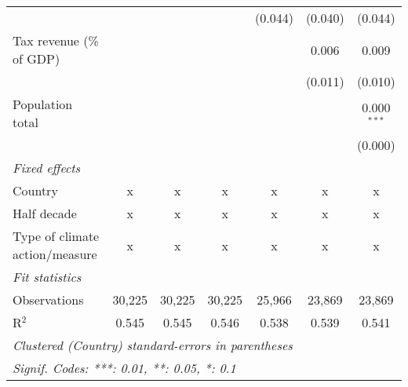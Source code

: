 \begin{tabular}{lcccccc}
                                                                     &         &         &                & (0.044)      & (0.040)       & (0.044)\\   
   Tax revenue (\% of GDP)                                           &         &         &                &              & 0.006         & 0.009\\   
                                                                     &         &         &                &              & (0.011)       & (0.010)\\   
   Population total                                                  &         &         &                &              &               & 0.000$^{***}$\\   
                                                                     &         &         &                &              &               & (0.000)\\   
   \emph{Fixed effects}\\
   Country                                                           & x       & x       & x              & x            & x             & x\\  
   Half decade                                                       & x       & x       & x              & x            & x             & x\\  
   Type of climate action/measure                                    & x       & x       & x              & x            & x             & x\\  
   \midrule \emph{Fit statistics}\\
   Observations                                                      & 30,225  & 30,225  & 30,225         & 25,966       & 23,869        & 23,869\\  
   R$^2$                                                             & 0.545   & 0.545   & 0.546          & 0.538        & 0.539         & 0.541\\  
   \midrule
   \multicolumn{7}{l}{\emph{Clustered (Country) standard-errors in parentheses}}\\
   \multicolumn{7}{l}{\emph{Signif. Codes: ***: 0.01, **: 0.05, *: 0.1}}\\
\end{tabular}
\par\endgroup


